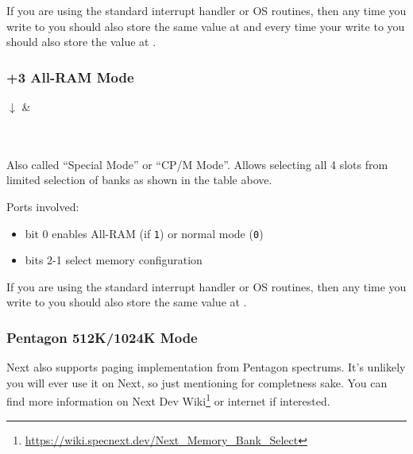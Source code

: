 If you are using the standard interrupt handler or OS routines, then any time you write to  you should also store the same value at  and every time your write to  you should also store the value at .


\subsubsection{+3 All-RAM Mode}

\begin{PagingTableLegacy}
	\PagingTableLegacyItem{}{$\uparrow$}{$\uparrow$}{$\uparrow$}{$\uparrow$}
	$\downarrow$ & \\
	 \\
	 \\
\end{PagingTableLegacy}

Also called ``Special Mode'' or ``CP/M Mode''. Allows selecting all 4 slots from limited selection of banks as shown in the table above.

Ports involved:

\begin{itemize}[topsep=0pt,itemsep=0pt]
	\item {} bit 0 enables All-RAM (if {\tt 1}) or normal mode ({\tt 0})
	\item {} bits 2-1 select memory configuration
\end{itemize}

If you are using the standard interrupt handler or OS routines, then any time you write to  you should also store the same value at .


\subsubsection{Pentagon 512K/1024K Mode}

Next also supports paging implementation from Pentagon spectrums. It's unlikely you will ever use it on Next, so just mentioning for completness sake. You can find more information on Next Dev Wiki\footnote{\url{https://wiki.specnext.dev/Next_Memory_Bank_Select}} or internet if interested.



